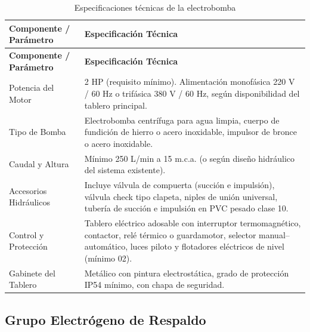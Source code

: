 \documentclass[12pt,a4paper]{article}
\begin{document}
\begin{longtable}{L{4.5cm}p{10.5cm}}
  \caption{Especificaciones técnicas de la electrobomba}
  \label{tab:bomba}\\
  \toprule
  \textbf{Componente / Parámetro} & \textbf{Especificación Técnica} \\
  \midrule
  \endfirsthead
  \toprule
  \textbf{Componente / Parámetro} & \textbf{Especificación Técnica} \\
  \midrule
  \endhead
  Potencia del Motor & 2 HP (requisito mínimo). Alimentación monofásica 220 V / 60 Hz o trifásica 380 V / 60 Hz, según disponibilidad del tablero principal. \\
  Tipo de Bomba & Electrobomba centrífuga para agua limpia, cuerpo de fundición de hierro o acero inoxidable, impulsor de bronce o acero inoxidable. \\
  Caudal y Altura & Mínimo 250 L/min a 15 m.c.a. (o según diseño hidráulico del sistema existente). \\
  Accesorios Hidráulicos & Incluye válvula de compuerta (succión e impulsión), válvula check tipo clapeta, niples de unión universal, tubería de succión e impulsión en PVC pesado clase 10. \\
  Control y Protección & Tablero eléctrico adosable con interruptor termomagnético, contactor, relé térmico o guardamotor, selector manual--automático, luces piloto y flotadores eléctricos de nivel (mínimo 02). \\
  Gabinete del Tablero & Metálico con pintura electrostática, grado de protección IP54 mínimo, con chapa de seguridad. \\
  \bottomrule
\end{longtable}

\subsection{Grupo Electrógeno de Respaldo}
\end{document}
